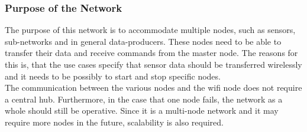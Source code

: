 \subsubsection{Purpose of the Network}
The purpose of this network is to accommodate multiple nodes, such as sensors, sub-networks and in general data-producers.
These nodes need to be able to transfer their data and receive commands from the master node.
The reasons for this is, that the use cases specify that sensor data should be transferred wirelessly and it needs to be possibly to start and stop specific nodes.
\\
The communication between the various nodes and the wifi node does not require a central hub.
Furthermore, in the case that one node fails, the network as a whole should still be operative.
Since it is a multi-node network and it may require more nodes in the future, scalability is also required.

